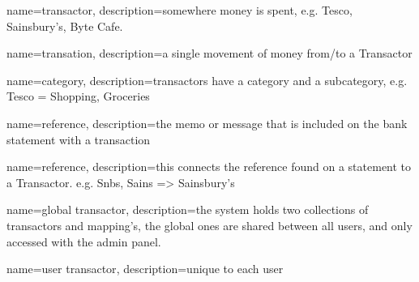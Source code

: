 {
  name={transactor},
  description={somewhere money is spent, e.g. Tesco, Sainsbury's, Byte Cafe.}
}

{
  name={transation},
  description={a single movement of money from/to a Transactor}
}

{
  name={category},
  description={transactors have a category and a subcategory, e.g. Tesco = Shopping, Groceries}
}

{
  name={reference},
  description={the memo or message that is included on the bank statement with a transaction}
}

{
  name={reference},
  description={this connects the reference found on a statement to a Transactor. e.g. Snbs, Sains => Sainsbury's}
}

{
  name={global transactor},
  description={the system holds two collections of transactors and mapping's, the global ones
are shared between all users, and only accessed with the admin panel.}
}

{
  name={user transactor},
  description={unique to each user}
}